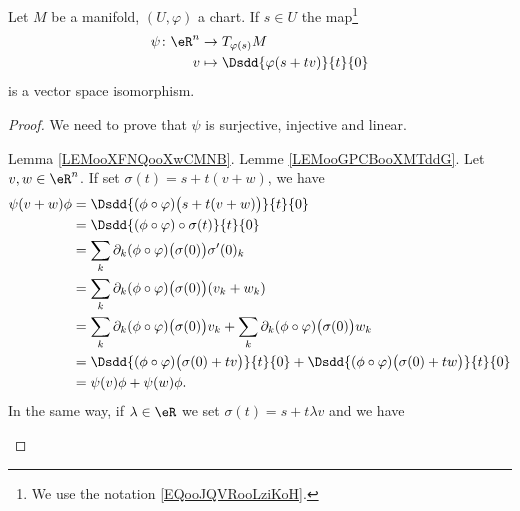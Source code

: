 \begin{proposition}     \label{PROPooMEPPooRonxuh}
	Let \( M\) be a manifold, \( (U, \varphi)\) a chart. If \( s\in U\) the map\footnote{We use the notation \eqref{EQooJQVRooLziKoH}.}
	\begin{equation}        \label{EQooJMTJooZNzREy}
		\begin{aligned}
			\psi\colon \eR^n & \to T_{\varphi(s)}M                  \\
			v                & \mapsto \Dsdd{ \varphi(s+tv) }{t}{0}
		\end{aligned}
	\end{equation}
	is a vector space isomorphism.
\end{proposition}

\begin{proof}
	We need to prove that \( \psi\) is surjective, injective and linear.
	\begin{subproof}
		\spitem[Surjective] Lemma \ref{LEMooXFNQooXwCMNB}.
		\spitem[Injective] Lemme \ref{LEMooGPCBooXMTddG}.
		\spitem[Linear]
		Let \( v,w\in \eR^n\). If set \( \sigma(t)=s+t(v+w)\), we have
		\begin{subequations}
			\begin{align}
				\psi(v+w)\phi & =\Dsdd{ (\phi\circ \varphi)\big( s+t(v+w) \big) }{t}{0}                                                                \\
				              & =\Dsdd{ (\phi\circ \varphi)\circ \sigma(t) }{t}{0}                                                                     \\
				              & =\sum_k\partial_k(\phi\circ\varphi)\big( \sigma(0) \big)\sigma'(0)_k                                                   \\
				              & =\sum_k\partial_k(\phi\circ\varphi)\big( \sigma(0) \big)(v_k+w_k)                                                      \\
				              & =\sum_k\partial_k(\phi\circ\varphi)\big( \sigma(0) \big)v_k+\sum_k\partial_k(\phi\circ\varphi)\big( \sigma(0) \big)w_k \\
				              & =\Dsdd{ (\phi\circ\varphi)\big( \sigma(0)+tv \big) }{t}{0}+\Dsdd{ (\phi\circ\varphi)\big( \sigma(0)+tw \big) }{t}{0}   \\
				              & =\psi(v)\phi+\psi(w)\phi.
			\end{align}
		\end{subequations}
		In the same way, if \( \lambda\in \eR\) we set \( \sigma(t)=s+t\lambda v\) and we have

\end{subproof}
\end{proof}
